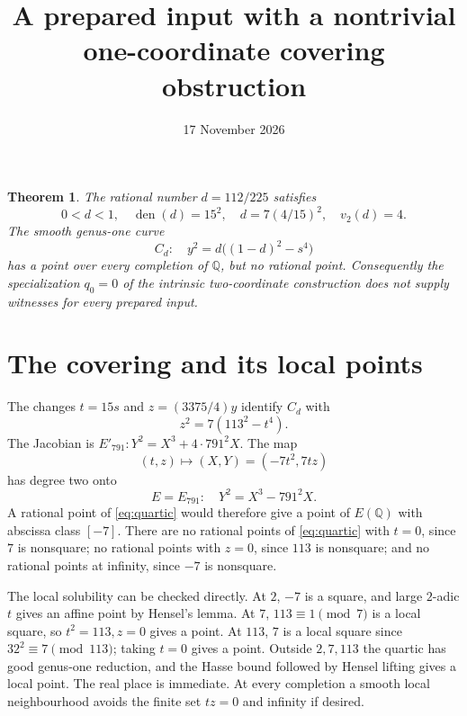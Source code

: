 \documentclass[11pt]{article}
\newtheorem{theorem}{Theorem}
\newcommand{\Q}{\mathbb Q}
\begin{document}
\title{A prepared input with a nontrivial one-coordinate covering obstruction}
\author{}\date{17 November 2026}\maketitle

\begin{theorem}\label{thm:main}
The rational number $d=112/225$ satisfies
\[
 0<d<1,\quad\operatorname{den}(d)=15^2,\quad
 d=7(4/15)^2,\quad v_2(d)=4.
\]
The smooth genus-one curve
\[
 C_d:\quad y^2=d\bigl((1-d)^2-s^4\bigr)
\]
has a point over every completion of $\Q$, but no rational point. Consequently the specialization $q_0=0$ of the intrinsic two-coordinate construction does not supply witnesses for every prepared input.
\end{theorem}

\section{The covering and its local points}
The changes $t=15s$ and $z=(3375/4)y$ identify $C_d$ with
\begin{equation}\label{eq:quartic}
 z^2=7(113^2-t^4).
\end{equation}
The Jacobian is $E'_{791}:Y^2=X^3+4\cdot791^2X$.
The map
\begin{equation}\label{eq:cover}
 (t,z)\longmapsto(X,Y)=(-7t^2,7tz)
\end{equation}
has degree two onto
\[
 E=E_{791}:\quad Y^2=X^3-791^2X.
\]
A rational point of \eqref{eq:quartic} would therefore give a point of $E(\Q)$ with abscissa class $[-7]$. There are no rational points of \eqref{eq:quartic} with $t=0$, since $7$ is nonsquare; no rational points with $z=0$, since $113$ is nonsquare; and no rational points at infinity, since $-7$ is nonsquare.

The local solubility can be checked directly. At $2$, $-7$ is a square, and large $2$-adic $t$ gives an affine point by Hensel's lemma. At $7$, $113\equiv1\pmod7$ is a local square, so $t^2=113,z=0$ gives a point. At $113$, $7$ is a local square since $32^2\equiv7\pmod{113}$; taking $t=0$ gives a point. Outside $2,7,113$ the quartic has good genus-one reduction, and the Hasse bound followed by Hensel lifting gives a local point. The real place is immediate. At every completion a smooth local neighbourhood avoids the finite set $tz=0$ and infinity if desired.
\end{document}

